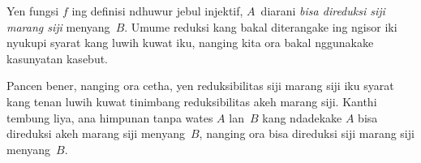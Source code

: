 \documentclass[../../../include/open-logic-section]{subfiles}
\begin{document}
Yen fungsi $f$ ing definisi ndhuwur
jebul injektif, $A$~diarani
\emph{bisa direduksi siji marang siji}
menyang~$B$. Umume reduksi kang
bakal diterangake ing ngisor iki
nyukupi syarat kang luwih kuwat iku,
nanging kita ora bakal nggunakake
kasunyatan kasebut.

\begin{digress}
Pancen bener, nanging ora cetha,
yen reduksibilitas siji marang siji
iku syarat kang tenan luwih kuwat
tinimbang reduksibilitas akeh marang siji.
Kanthi tembung liya, ana himpunan
tanpa wates $A$ lan~$B$ kang ndadekake
$A$ bisa direduksi akeh marang siji
menyang~$B$, nanging ora bisa direduksi
siji marang siji menyang~$B$.
\end{digress}
\end{document}
